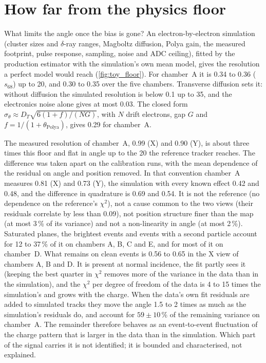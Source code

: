 \section{How far from the physics floor}\label{sec:floor}
What limits the angle once the bias is gone? An electron-by-electron simulation (cluster sizes and
$\delta$-ray ranges, Magboltz diffusion, Polya gain, the measured footprint, pulse response, sampling, noise and ADC
ceiling), fitted by the production estimator with the simulation's own mean model, gives the resolution a perfect
model would reach (\cref{fig:toy_floor}). For chamber~A it is 0.34 to 0.36\textdegree{} ($s_{68}$) up to 20\textdegree, and 0.30 to
0.35\textdegree{} over the five chambers. Transverse diffusion sets it: without diffusion the simulated resolution is below
0.1\textdegree{} up to 35\textdegree, and the electronics noise alone gives at most 0.03\textdegree. The closed form
$\sigma_\theta\approx D_T\sqrt{6(1+f)/(NG)}$, with $N$ drift electrons, gap $G$ and $f=1/(1+\theta_\mathrm{Polya})$,
gives 0.29\textdegree{} for chamber~A.

The measured resolution of chamber~A, 0.99\textdegree{} (X) and 0.90\textdegree{} (Y), is about three times this
floor and flat in angle up to the 20\textdegree{} the reference tracker reaches. The difference was taken apart on
the calibration runs, with the mean dependence of the residual on angle and position removed. In that convention
chamber~A measures 0.81\textdegree{} (X) and 0.73\textdegree{} (Y), the simulation with every known effect 0.42 and
0.48\textdegree, and the difference in quadrature is 0.69 and 0.54\textdegree. It is not the reference (no dependence
on the reference's $\chi^2$), not a cause common to the two views (their residuals correlate by less than 0.09), not
position structure finer than the map (at most 3\,\% of its variance) and not a non-linearity in angle (at most
2\,\%). Saturated planes, the brightest events and events with a second particle account for 12 to 37\,\% of it on
chambers A, B, C and E, and for most of it on chamber~D. What remains on clean events is 0.56 to 0.65\textdegree{} in the X view of chambers A, B and D. It is
present at normal incidence, the fit partly sees it (keeping the best quarter in $\chi^2$ removes more of the variance
in the data than in the simulation), and the $\chi^2$ per degree of freedom of the data is 4 to 15 times the
simulation's and grows with the charge. When the data's own fit residuals are added to simulated tracks they move
the angle 1.5 to 2 times as much as the simulation's residuals do, and account for $59\pm10$\,\% of the remaining
variance on chamber~A. The remainder therefore behaves as an event-to-event fluctuation of the charge pattern that
is larger in the data than in the simulation. Which part of the signal carries it is not identified; it is bounded
and characterised, not explained.


